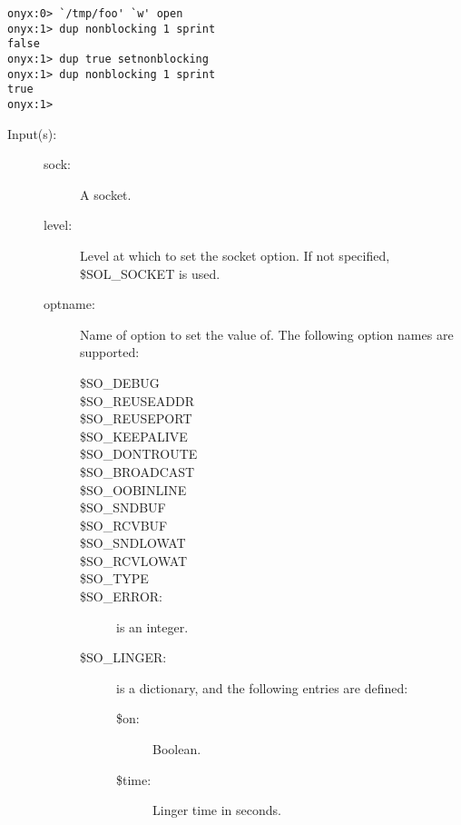 \begin{description}
\begin{description}
\begin{verbatim}
onyx:0> `/tmp/foo' `w' open
onyx:1> dup nonblocking 1 sprint
false
onyx:1> dup true setnonblocking
onyx:1> dup nonblocking 1 sprint
true
onyx:1>
		\end{verbatim}
	\end{description}
\label{systemdict:setsockopt}
\item[{\onyxop{sock level optname optval}{setsockopt}{--}}: ]
\item[{\onyxop{sock optname optval}{setsockopt}{--}}: ]
	\begin{description}\item[]
	\item[Input(s): ]
		\begin{description}\item[]
		\item[sock: ]
			A socket.
		\item[level: ]
			Level at which to set the socket option.  If not
			specified, \$SOL\_SOCKET is used.
		\item[optname: ]
			Name of option to set the value of.  The following
			option names are supported:
			\begin{description}%
			\item[\$SO\_DEBUG]
			\item[\$SO\_REUSEADDR]
			\item[\$SO\_REUSEPORT]
			\item[\$SO\_KEEPALIVE]
			\item[\$SO\_DONTROUTE]
			\item[\$SO\_BROADCAST]
			\item[\$SO\_OOBINLINE]
			\item[\$SO\_SNDBUF]
			\item[\$SO\_RCVBUF]
			\item[\$SO\_SNDLOWAT]
			\item[\$SO\_RCVLOWAT]
			\item[\$SO\_TYPE]
			\item[\$SO\_ERROR: ]
				 is an integer.
			\item[\$SO\_LINGER: ]
				 is a dictionary, and the
				following entries are defined:
				\begin{description}%
				\item[\$on: ]
					Boolean.
				\item[\$time: ]
					Linger time in seconds.
				\end{description}

\end{description}
\end{description}
\end{description}
\end{description}
